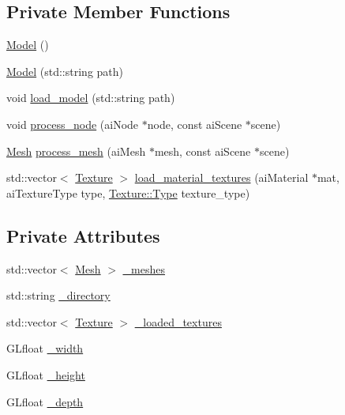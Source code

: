 \subsection*{Private Member Functions}
\begin{DoxyCompactItemize}
\item 
\hyperlink{classLarp_1_1Model_ab37768f80e32cdd8b6f54c4a254f7d3a}{Model} ()
\item 
\hyperlink{classLarp_1_1Model_aa6ec73e894b7d2388bfd0c08bfada774}{Model} (std\+::string path)
\item 
void \hyperlink{classLarp_1_1Model_a5c28074e770e1826496458b82651fefd}{load\+\_\+model} (std\+::string path)
\item 
void \hyperlink{classLarp_1_1Model_ad5005f3aa6b553cbcdb9b50cc771ff28}{process\+\_\+node} (ai\+Node $\ast$node, const ai\+Scene $\ast$scene)
\item 
\hyperlink{classLarp_1_1Mesh}{Mesh} \hyperlink{classLarp_1_1Model_a4179a0a55a8a422d6bd1a7f6083a70d4}{process\+\_\+mesh} (ai\+Mesh $\ast$mesh, const ai\+Scene $\ast$scene)
\item 
std\+::vector$<$ \hyperlink{classLarp_1_1Texture}{Texture} $>$ \hyperlink{classLarp_1_1Model_a732230e84175c2e471309bb9b7e08f31}{load\+\_\+material\+\_\+textures} (ai\+Material $\ast$mat, ai\+Texture\+Type type, \hyperlink{classLarp_1_1Texture_aa4e19b5df6a8f1f0eae8235db7e52daa}{Texture\+::\+Type} texture\+\_\+type)
\end{DoxyCompactItemize}
\subsection*{Private Attributes}
\begin{DoxyCompactItemize}
\item 
std\+::vector$<$ \hyperlink{classLarp_1_1Mesh}{Mesh} $>$ \hyperlink{classLarp_1_1Model_ae75758feb59857f6b907bbfa0cf993f2}{\+\_\+meshes}
\item 
std\+::string \hyperlink{classLarp_1_1Model_a568e7aeee510320b2378a0fc57c5c7c5}{\+\_\+directory}
\item 
std\+::vector$<$ \hyperlink{classLarp_1_1Texture}{Texture} $>$ \hyperlink{classLarp_1_1Model_ac5e40faa76039650ae6b32828b8681f9}{\+\_\+loaded\+\_\+textures}
\item 
G\+Lfloat \hyperlink{classLarp_1_1Model_a9663e0b21638f43840df65980ee3424f}{\+\_\+width}
\item 
G\+Lfloat \hyperlink{classLarp_1_1Model_ad1df92245551dec38b11c6c3ec7caf57}{\+\_\+height}
\item 
G\+Lfloat \hyperlink{classLarp_1_1Model_ab68df9de45639c8e006add007c4249b2}{\+\_\+depth}
\end{DoxyCompactItemize}
